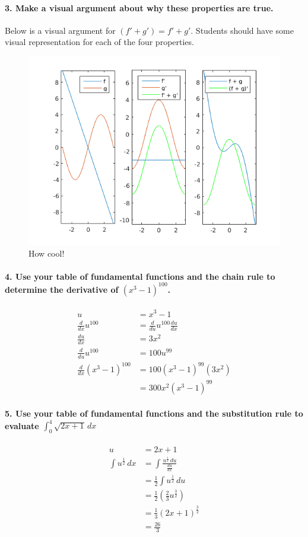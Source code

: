 \documentclass{article}
\begin{document}
\paragraph{3. Make a visual argument about why these properties are true.} Below is a visual argument for $(f'+g') = f' + g'$. Students should have some visual representation for each of the four properties.

\begin{figure}[H]
    \centering
    \includegraphics[width=0.5\columnwidth]{visual.png}
    \caption{How cool!}
\end{figure}

\paragraph{4. Use your table of fundamental functions and the chain rule to determine the derivative of $(x^3 − 1)^100$.}

\begin{align*}
    u &= x^3 - 1 \\
    \frac{d}{dx}u^{100} &= \frac{d}{du}u^{100} \frac{du}{dx} \\
    \frac{du}{dx} &= 3x^2 \\
    \frac{d}{du}u^{100} &= 100u^{99} \\
    \frac{d}{dx}(x^3 − 1)^{100} &= 100(x^3 - 1)^{99} (3x^2) \\
    &= 300x^2 (x^3 -1)^{99}
\end{align*}

\paragraph{5. Use your table of fundamental functions and the substitution rule to evaluate $\int_0^4 \sqrt{2x+1}\,dx$}

\begin{align*}
    u &= 2x + 1 \\
    \int u^\frac{1}{2} \, dx &= \int \frac{u^\frac{1}{2} \, du}{\frac{du}{dx}} \\
    &= \frac{1}{2} \int u^\frac{1}{2} \, du \\
    &= \frac{1}{2} \left(\frac{2}{3}u^\frac{3}{2}\right) \\
    &= \frac{1}{3}\left(2x + 1\right)^\frac{3}{2} \\
    &= \frac{26}{3}
\end{align*}
\end{document}

